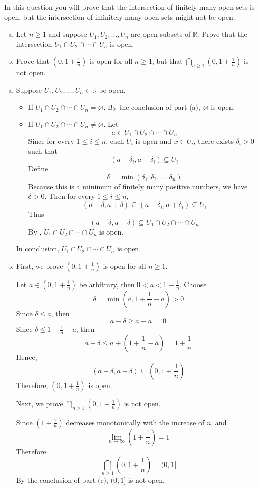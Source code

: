 \begin{chapex}
In this question you will prove that the intersection of finitely many open sets is open, but the intersection of infinitely many open sets might not be open.
\begin{enumerate}[(a)]
\item Let $n \ge 1$ and suppose $U_1, U_2, \dots, U_n$ are open subsets of $\mathbb{R}$. Prove that the intersection $U_1 \cap U_2 \cap \cdots \cap U_n$ is open.
\item Prove that $(0,1+\frac{1}{n})$ is open for all $n \ge 1$, but that $\bigcap_{n \ge 1} (0,1+\textstyle\frac{1}{n})$ is not open.
\end{enumerate}
\end{chapex}

\begin{mysolution}
    \begin{enumerate}[(a)]
    \item Suppose $U_1, U_2, \dots, U_n \in \mathbb{R}$ be open.
    \begin{itemize}
        \item If $U_1 \cap U_2 \cap \cdots \cap U_n = \varnothing$. By the conclusion of  part (a), $\varnothing$ is open.
        \item If $U_1 \cap U_2 \cap \cdots \cap U_n \ne \varnothing$. Let
        \[a \in U_1 \cap U_2 \cap \cdots \cap U_n\]
        Since for every $1 \le i \le n$, each $U_i$ is open and $x \in U_i$, there exists $\delta_i>0$ such that
        \[(a-\delta_i, a+\delta_i) \subseteq U_i\]
        Define
        \[\delta = \min(\delta_1, \delta_2, \dots, \delta_n)\]
        Because this is a minimum of finitely many positive numbers, we have $\delta>0$. Then for every $1 \le i \le n$,
        \[(a-\delta, a+\delta) \subseteq (a-\delta_i, a+\delta_i) \subseteq U_i\]
        Thus
        \[(a-\delta, a+\delta) \subseteq U_1 \cap U_2 \cap \cdots \cap U_n\]
        By , $U_1 \cap U_2 \cap \cdots \cap U_n$ is open.
    \end{itemize}
    In conclusion, $U_1 \cap U_2 \cap \cdots \cap U_n$ is open.
    \item First, we prove $(0,1+\frac{1}{n})$ is open for all $n \ge 1$. 
    
    Let $a \in (0, 1+\frac{1}{n})$ be arbitrary, then $0<a<1+\frac{1}{n}$. Choose
    \[\delta = \min\left(a, 1+\frac{1}{n}-a\right) > 0\]
    Since $\delta \le a$, then 
    \[a-\delta \ge a-a\ = 0\]
    Since $\delta \le 1+\frac{1}{n}-a$, then 
    \[a+\delta \le a+(1+\frac{1}{n}-a) = 1+\frac{1}{n}\]
    Hence,
    \[(a-\delta,a+\delta) \subseteq (0, 1+\frac{1}{n})\]
    Therefore, $(0, 1+\frac{1}{n})$ is open.

    Next, we prove $\bigcap_{n \ge 1} (0, 1+\frac{1}{n})$ is not open.

    Since $(1+\frac{1}{n})$ decreases monotonically with the increase of $n$, and 
    \[\lim_{n \to \infty} \left(1+\frac{1}{n}\right) = 1\] 
    Therefore
    \[\bigcap_{n \ge 1} \left(0, 1+\frac{1}{n}\right) = (0,1]\]
    By the conclusion of  part (c), $(0,1]$ is not open.
    \end{enumerate}
\end{mysolution}

